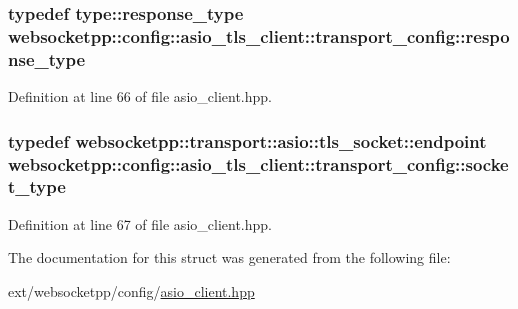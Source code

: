 \subsubsection[{response\+\_\+type}]{\setlength{\rightskip}{0pt plus 5cm}typedef {\bf type\+::response\+\_\+type} {\bf websocketpp\+::config\+::asio\+\_\+tls\+\_\+client\+::transport\+\_\+config\+::response\+\_\+type}}\label{structwebsocketpp_1_1config_1_1asio__tls__client_1_1transport__config_a34d2cfd009eb65e18b24b265de0c785d}


Definition at line 66 of file asio\+\_\+client.\+hpp.

\hypertarget{structwebsocketpp_1_1config_1_1asio__tls__client_1_1transport__config_a5d1ee7d647e7f3a9e5c0da24b27a9803}{}
\subsubsection[{socket\+\_\+type}]{\setlength{\rightskip}{0pt plus 5cm}typedef {\bf websocketpp\+::transport\+::asio\+::tls\+\_\+socket\+::endpoint} {\bf websocketpp\+::config\+::asio\+\_\+tls\+\_\+client\+::transport\+\_\+config\+::socket\+\_\+type}}\label{structwebsocketpp_1_1config_1_1asio__tls__client_1_1transport__config_a5d1ee7d647e7f3a9e5c0da24b27a9803}


Definition at line 67 of file asio\+\_\+client.\+hpp.



The documentation for this struct was generated from the following file\+:\begin{DoxyCompactItemize}
\item 
ext/websocketpp/config/\hyperlink{asio__client_8hpp}{asio\+\_\+client.\+hpp}\end{DoxyCompactItemize}
